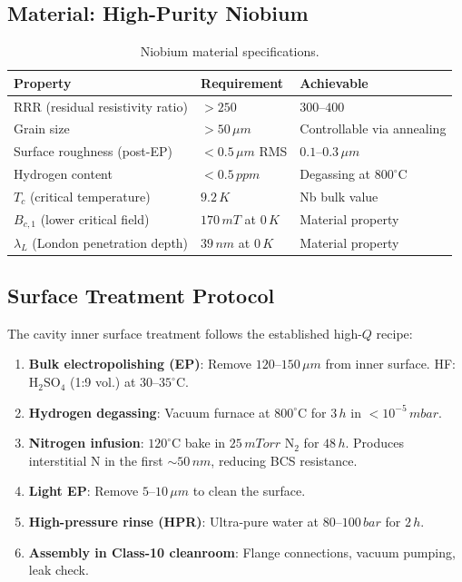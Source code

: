 \documentclass[12pt,a4paper]{article}
\begin{document}
\subsection{Material: High-Purity Niobium}

\begin{table}[H]
\centering
\caption{Niobium material specifications.}
\begin{tabular}{lll}
\toprule
\textbf{Property} & \textbf{Requirement} & \textbf{Achievable} \\
\midrule
RRR (residual resistivity ratio) & $> 250$ & $300$--$400$ \\
Grain size & $> 50\,\si{\mu m}$ & Controllable via annealing \\
Surface roughness (post-EP) & $< 0.5\,\si{\mu m}$ RMS & $0.1$--$0.3\,\si{\mu m}$ \\
Hydrogen content & $< 0.5\,\si{ppm}$ & Degassing at $800^\circ$C \\
$T_c$ (critical temperature) & $9.2\,\si{K}$ & Nb bulk value \\
$B_{c,1}$ (lower critical field) & $170\,\si{mT}$ at $0\,\si{K}$ & Material property \\
$\lambda_L$ (London penetration depth) & $39\,\si{nm}$ at $0\,\si{K}$ & Material property \\
\bottomrule
\end{tabular}
\end{table}

\subsection{Surface Treatment Protocol}

The cavity inner surface treatment follows the established high-$Q$ recipe:
\begin{enumerate}
\item \textbf{Bulk electropolishing (EP)}: Remove $120$--$150\,\si{\mu m}$ from inner surface. HF:$\mathrm{H_2SO_4}$ (1:9 vol.) at $30$--$35^\circ$C.
\item \textbf{Hydrogen degassing}: Vacuum furnace at $800^\circ$C for $3\,\si{h}$ in $< 10^{-5}\,\si{mbar}$.
\item \textbf{Nitrogen infusion}: $120^\circ$C bake in $25\,\si{mTorr}$ $\mathrm{N_2}$ for $48\,\si{h}$. Produces interstitial N in the first ${\sim}50\,\si{nm}$, reducing BCS resistance.
\item \textbf{Light EP}: Remove $5$--$10\,\si{\mu m}$ to clean the surface.
\item \textbf{High-pressure rinse (HPR)}: Ultra-pure water at $80$--$100\,\si{bar}$ for $2\,\si{h}$.
\item \textbf{Assembly in Class-10 cleanroom}: Flange connections, vacuum pumping, leak check.
\end{enumerate}
\end{document}
